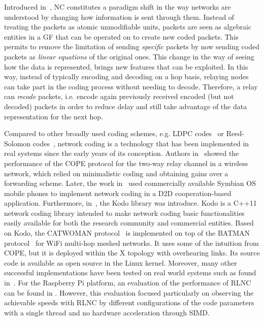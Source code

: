 Introduced in~\cite{ahlswede2000network}, \ac{NC}
constitutes a paradigm shift in the way networks are understood
by changing how information is sent through them.
Instead of treating the packets as atomic
unmodifiable units, packets are seen as algebraic entities in a \ac{GF}
that can be operated on to create new coded packets. This permits to
remove the limitation of sending \textit{specific} packets by now sending
coded packets as \textit{linear equations} of the original ones. This
change in the way of seeing how the data is represented, brings new
features that can be exploited. In this way, instead of typically encoding
and decoding on a hop basis, relaying nodes can take part in the
coding process without needing to decode. Therefore, a relay can
\textit{recode} packets, i.e. encode again previously received encoded
(but not decoded) packets in order to reduce delay and still
take advantage of the data representation for the next hop.

Compared to other broadly used coding schemes, e.g. \ac{LDPC}
codes~\cite{gallager1962low} or Reed-Solomon
codes~\cite{reed1960polynomial}, network coding is a technology that
has been implemented in real systems since the early years of its
conception. Authors in~\cite{katti2008xors} showed the
performance of the COPE protocol for the two-way relay channel
in a wireless network, which relied on minimalistic coding and obtaining
gains over a forwarding scheme. Later, the work in~\cite{pedersen2008implementation} used commercially available
Symbian OS mobile phones to implement network coding in a
\ac{D2D} cooperation-based application. Furthermore,
in~\cite{kodo2011pedersen}, the Kodo library was introduce. Kodo is
a C++11 network coding library intended to make network coding
basic functionalities easily available for both the research community
and commercial entities. Based on Kodo, the CATWOMAN
protocol~\cite{hundeboll2012catwoman} is implemented on top of the
BATMAN protocol~\cite{johnson2008simple} for WiFi multi-hop meshed
networks. It uses some of the intuition from COPE, but it is deployed
within the X topology with overhearing links. Its source code is available
as open source in the Linux kernel. Moreover, many other successful
implementations have been tested on real world systems such as
found in~\cite{pahlevani2013playncool,krigslund2013core,
paramanathan2013leanandmean}. For the Raspberry Pi platform, an evaluation
of the performance of \ac{RLNC} can be found in \cite{paramanathan2014sharing}.
However, this evaluation focused particularly on observing the achievable
speeds with \ac{RLNC} \cite{ho2006random} by different configurations of
the code parameters with a single thread and no hardware acceleration through
\ac{SIMD}.

